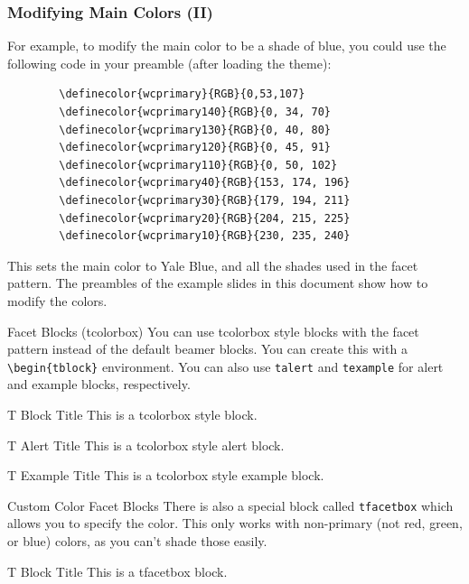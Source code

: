 \documentclass[aspectratio=1610]{beamer}
\begin{document}
\begin{frame}[fragile]
    \frametitle{Modifying Main Colors (II)}
    For example, to modify the main color to be a shade of blue, you could use the following code in your preamble (after loading the theme):
    \begin{verbatim}
        \definecolor{wcprimary}{RGB}{0,53,107}
        \definecolor{wcprimary140}{RGB}{0, 34, 70}
        \definecolor{wcprimary130}{RGB}{0, 40, 80}
        \definecolor{wcprimary120}{RGB}{0, 45, 91}
        \definecolor{wcprimary110}{RGB}{0, 50, 102}
        \definecolor{wcprimary40}{RGB}{153, 174, 196}
        \definecolor{wcprimary30}{RGB}{179, 194, 211}
        \definecolor{wcprimary20}{RGB}{204, 215, 225}
        \definecolor{wcprimary10}{RGB}{230, 235, 240}
    \end{verbatim}
    This sets the main color to Yale Blue, and all the shades used in the facet pattern. The preambles of the example slides in this document show how to modify the colors.
\end{frame}



\begin{frame}{Facet Blocks (tcolorbox)}
    You can use tcolorbox style blocks with the facet pattern instead of the default beamer blocks. You can create this with a \texttt{\textbackslash begin\{tblock\}} environment. You can also use \texttt{talert} and \texttt{texample} for alert and example blocks, respectively.
    \begin{tblock}{T Block Title}
        This is a tcolorbox style block.
    \end{tblock}
    \begin{talert}{T Alert Title}
        This is a tcolorbox style alert block.
    \end{talert}
    \begin{texample}{T Example Title}
        This is a tcolorbox style example block.
    \end{texample}
\end{frame}

\begin{frame}{Custom Color Facet Blocks}
    There is also a special block called \texttt{tfacetbox} which allows you to specify the color. This only works with non-primary (not red, green, or blue) colors, as you can't shade those easily.
    \begin{tfacetbox}[nudarkyellow]{T Block Title}
        This is a tfacetbox block.
    \end{tfacetbox}
\end{frame}
\end{document}

